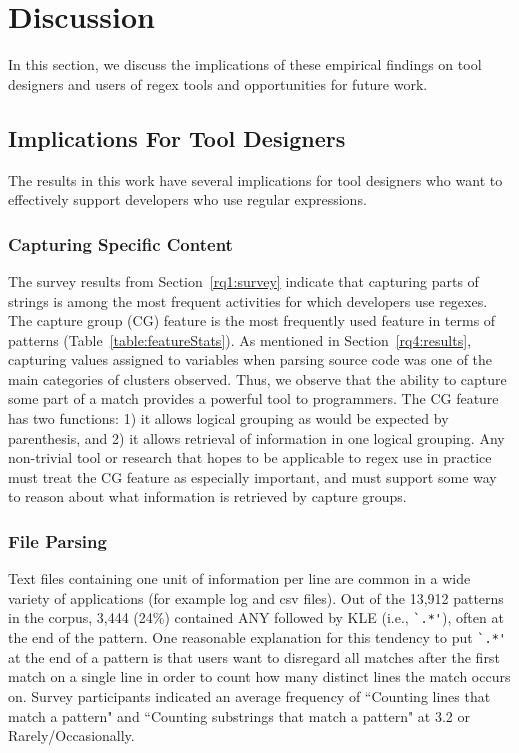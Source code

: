 \section{Discussion}
\label{sec:discussion}

In this section, we discuss the implications of these empirical findings on tool designers and users of regex tools and opportunities for future work.

\subsection{Implications For Tool Designers}
The results in this work have several implications for tool designers who want to effectively support developers who use regular expressions. 

\subsubsection{Capturing Specific Content}
The survey results from Section~\ref{rq1:survey} indicate that capturing parts of strings is among the most frequent activities for which developers use regexes.  
The capture group (CG) feature is the most frequently used feature in terms of patterns (Table~\ref{table:featureStats}).  
As mentioned in Section~\ref{rq4:results}, capturing values assigned to variables when parsing source code was one of the main categories of clusters observed.  
Thus, we observe that the ability to capture some part of a match provides a powerful tool to programmers.  
The CG feature has two functions: 1) it allows logical grouping as would be expected by parenthesis, and 2) it allows retrieval of information in one logical grouping.  
Any non-trivial tool or research that hopes to be applicable to regex use in practice must treat the CG feature as especially important, and must support some way to reason about what information is retrieved by capture groups.

\subsubsection{File Parsing}
Text files containing one unit of information per line are common in a wide variety of applications (for example log and csv files).  Out of the 13,912 patterns in the corpus, 3,444 (24\%) contained ANY followed by KLE  (i.e., \verb!`.*'!), often at the end of the pattern.
One reasonable explanation for this tendency to put \verb!`.*'! at the end of a pattern is that users want to disregard all matches after the first match on a single line in order to count how many distinct lines the match occurs on.  Survey participants indicated an average frequency of ``Counting lines that match a pattern" and ``Counting substrings that match a pattern" at 3.2 or Rarely/Occasionally.

